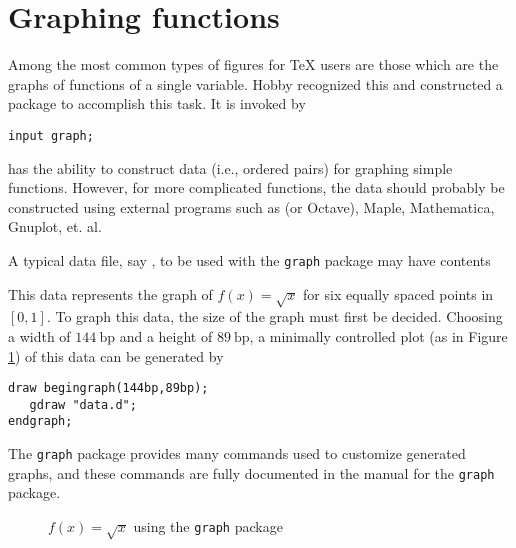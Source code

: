 \section{Graphing functions}
\label{sec:graphing}

Among the most common types of figures for \TeX{} users are those which are the graphs of functions of a single variable.  Hobby recognized this and constructed a package to accomplish this task.  It is invoked by
\begin{lstlisting}[xleftmargin=80bp]
input graph;
\end{lstlisting}
\MP{} has the ability to construct data (i.e., ordered pairs) for graphing simple functions.  However, for more complicated functions, the data should probably be constructed using external programs such as  (or Octave), Maple, Mathematica, Gnuplot, et. al.

A typical data file, say , to be used with the \texttt{graph} package may have contents

This data represents the graph of $f(x)=\sqrt{x}$ for six equally spaced points in $[0,1]$.  To graph this data, the size of the graph must first be decided.  Choosing a width of $144\mathrm{\ bp}$ and a height of $89\mathrm{\ bp}$, a minimally controlled plot (as in Figure \ref{fig:data}) of this data can be generated by
\begin{lstlisting}[xleftmargin=38bp]
draw begingraph(144bp,89bp);
   gdraw "data.d";
endgraph;
\end{lstlisting}
The \texttt{graph} package provides many commands used to customize generated graphs, and these commands are fully documented in the manual \cite{hobby:graph} for the \texttt{graph} package.
\begin{figure}[hptb]
   \begin{center}\end{center}
   \caption{$f(x)=\sqrt{x}$ using the \texttt{graph} package}\label{fig:data}
\end{figure}
